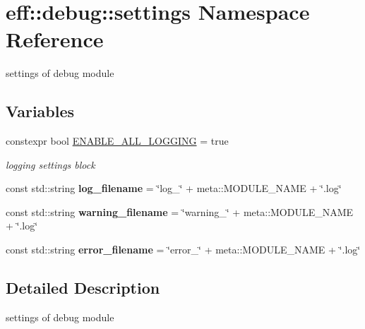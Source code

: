 \hypertarget{namespaceeff_1_1debug_1_1settings}{}\section{eff\+:\+:debug\+:\+:settings Namespace Reference}
\label{namespaceeff_1_1debug_1_1settings}


settings of debug module  


\subsection*{Variables}
\begin{DoxyCompactItemize}
\item 
\mbox{\label{namespaceeff_1_1debug_1_1settings_a108139ac94658787434414af28f04e10}} 
constexpr bool \hyperlink{namespaceeff_1_1debug_1_1settings_a108139ac94658787434414af28f04e10}{E\+N\+A\+B\+L\+E\+\_\+\+A\+L\+L\+\_\+\+L\+O\+G\+G\+I\+NG} = true
\begin{DoxyCompactList}\small\item\em logging settings block \end{DoxyCompactList}\item 
\mbox{\label{namespaceeff_1_1debug_1_1settings_aac87d0533a3614fae93db819651c8416}} 
const std\+::string {\bfseries log\+\_\+filename} = \char`\"{}log\+\_\+\char`\"{} + meta\+::\+M\+O\+D\+U\+L\+E\+\_\+\+N\+A\+ME + \char`\"{}.log\char`\"{}
\item 
\mbox{\label{namespaceeff_1_1debug_1_1settings_a3353e79c57d109f4a6be605caef33d53}} 
const std\+::string {\bfseries warning\+\_\+filename} = \char`\"{}warning\+\_\+\char`\"{} + meta\+::\+M\+O\+D\+U\+L\+E\+\_\+\+N\+A\+ME + \char`\"{}.log\char`\"{}
\item 
\mbox{\label{namespaceeff_1_1debug_1_1settings_a521865ce08e9f6ab7e564cb75ba7b4cf}} 
const std\+::string {\bfseries error\+\_\+filename} = \char`\"{}error\+\_\+\char`\"{} + meta\+::\+M\+O\+D\+U\+L\+E\+\_\+\+N\+A\+ME + \char`\"{}.log\char`\"{}
\end{DoxyCompactItemize}


\subsection{Detailed Description}
settings of debug module 